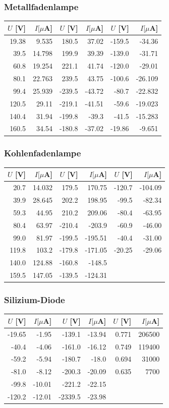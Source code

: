 \documentclass[12pt,a4paper]{article}
\begin{document}
\subsubsection*{Metallfadenlampe}
\begin{tabular}{|r|r|r|r|r|r|}
\hline
$U$ [V]&$I [\mu $A]&$U$ [V]&$I [\mu $A]&$U$ [V]&$I [\mu $A]\\
\hline
19.38&9.535&180.5&37.02&-159.5&-34.36\\
39.5&14.798&199.9&39.39&-139.0&-31.71\\
60.8&19.254&221.1&41.74&-120.0&-29.01\\
80.1&22.763&239.5&43.75&-100.6&-26.109\\
99.4&25.939&-239.5&-43.72&-80.7&-22.832\\
120.5&29.11&-219.1&-41.51&-59.6&-19.023\\
140.4&31.94&-199.8&-39.3&-41.5&-15.283\\
160.5&34.54&-180.8&-37.02&-19.86&-9.651\\
\hline
\end{tabular}

\subsubsection*{Kohlenfadenlampe}
\begin{tabular}{|r|r|r|r|r|r|}
\hline
$U$ [V]&$I [\mu $A]&$U$ [V]&$I [\mu $A]&$U$ [V]&$I [\mu $A]\\
\hline
20.7&14.032&179.5&170.75&-120.7&-104.09\\
39.9&28.645&202.2&198.95&-99.5&-82.34\\
59.3&44.95&210.2&209.06&-80.4&-63.95\\
80.4&63.97&-210.4&-203.9&-60.9&-46.00\\
99.0&81.97&-199.5&-195.51&-40.4&-31.00\\
119.8&103.2&-179.8&-171.05&-20.25&-29.06\\
140.0&124.88&-160.8&-148.5&&\\
159.5&147.05&-139.5&-124.31&&\\
\hline
\end{tabular}

\subsubsection*{Silizium-Diode}
\begin{tabular}{|r|r|r|r|r|r|}
\hline
$U$ [V]&$I [\mu $A]&$U$ [V]&$I [\mu $A]&$U$ [V]&$I [\mu $A]\\
\hline
-19.65&-1.95&-139.1&-13.94&0.771&206500\\
-40.4&-4.06&-161.0&-16.12&0.749&119400\\
-59.2&-5.94&-180.7&-18.0&0.694&31000\\
-81.0&-8.12&-200.3&-20.09&0.635&7700\\
-99.8&-10.01&-221.2&-22.15&&\\
-120.2&-12.01&-2339.5&-23.98&&\\
\hline
\end{tabular}
\end{document}
